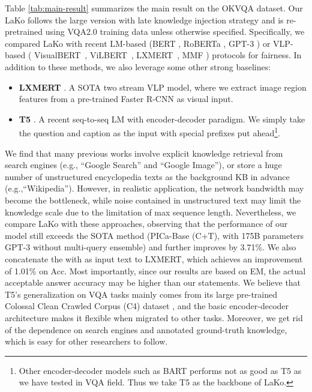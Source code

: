\documentclass[sigconf]{acmart}
\newcommand{\cjy}[1]{{\color{black}#1}}
\begin{document}
Table \ref{tab:main-result} summarizes the main result on the OKVQA dataset. 
Our LaKo follows the large version with late knowledge injection strategy and is re-pretrained using VQA2.0 training data unless otherwise specified.
Specifically, we compared \cjy{LaKo} with recent LM-based (BERT \cite{DBLP:conf/naacl/DevlinCLT19}, RoBERTa \cite{DBLP:journals/corr/abs-1907-11692}, GPT-3 \cite{DBLP:conf/nips/BrownMRSKDNSSAA20}) or VLP-based ( VisualBERT~\cite{DBLP:journals/corr/abs-1908-03557},  ViLBERT~\cite{DBLP:conf/nips/LuBPL19}, LXMERT~\cite{DBLP:conf/emnlp/TanB19}, MMF \cite{singh2020mmf}) protocols for fair\cjy{ness}.
In addition to these methods, we also \cjy{leverage some} other strong baselines: 
\begin{itemize}
	\item \textbf{LXMERT} \citep{DBLP:conf/emnlp/TanB19}. A SOTA two stream VLP model, where we extract image region features from \cjy{a} pre-trained Faster R-CNN \citep{DBLP:journals/pami/RenHG017} as visual input.
	\item \textbf{T5} \citep{DBLP:conf/emnlp/TanB19}. A recent seq-to-seq LM with encoder-decoder paradigm. We simpl\cjy{y} take the question and caption as the input with special prefixes put ahead\footnote{Other encoder-decoder models such as BART \cite{DBLP:conf/acl/LewisLGGMLSZ20} performs not as good as T5 as we have tested in VQA field. Thus we take T5 as the backbone of LaKo.}.
\end{itemize}



We find that many previous works involve explicit knowledge retrieval from search engine\cjy{s} (e.g., ``Google Search'' and ``Google Image''), or store \cjy{a} huge number of unstructured encyclopedia texts as the background KB in advance (e.g.,``Wikipedia'').
However, in realistic application, the network bandwidth may become the bottleneck, while noise contained in unstructured text may limit the knowledge scale due to the limitation of max sequence length.
Nevertheless, we compare 
LaKo with these approaches, observing that the performance of our model still exceeds the SOTA method (PICa-Base (C+T), with 175B parameters GPT-3 without multi-query ensemble) and further improves by 3.71\%. 
We also concatenate the  with  as input text to LXMERT, which achieves an improvement of 1.01\% on Acc.
Most importantly, since our results are based on EM, the actual acceptable answer accuracy may be higher than our statements. 
We believe that T5's generalization on VQA tasks mainly comes from its large pre-trained  Colossal Clean Crawled Corpus (C4) \citep{DBLP:conf/emnlp/TanB19} dataset , and the basic encoder-decoder architecture makes it flexible when migrated to other tasks. 
Moreover, we get rid of the dependence on search engines and annotated ground-truth knowledge, which is easy for other researchers to follow.
\end{document}
